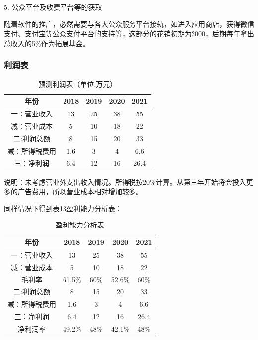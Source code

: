 \documentclass[10pt,letterpaper]{article}
\begin{document}
5. 公众平台及收费平台等的获取

随着软件的推广，必然需要与各大公众服务平台接轨，如进入应用商店，获得微信支付、支付宝等公众支付平台的支持等，这部分的花销初期为2000，后期每年拿出总收入的5\%作为拓展基金。

\subsubsection{利润表}

\begin{table}[!htbp]
\centering
\begin{tabular}{|c|c|c|c|c}
\hline
年份 & 2018 & 2019 & 2020 & 2021 \\
\hline
一：营业收入 & 13 & 25 & 38 &	55 \\
\hline
减：营业成本 & 5 & 10 & 18 & 22 \\
\hline
二:利润总额 & 8 & 15 & 20 & 33 \\
\hline
减：所得税费用	& 1.6 & 3 & 4 & 6.6 \\
\hline
三：净利润 & 6.4 & 12 & 16 & 26.4 \\
\hline
\end{tabular}
\caption{预测利润表（单位:万元）}\label{tab:aStrangeTable}
\end{table}

说明：未考虑营业外支出收入情况。所得税按20\%计算。从第三年开始将会投入更多的广告费用，所以营业成本相对增加较多。

同样情况下得到表13盈利能力分析表：

\begin{table}[!htbp]
\centering
\begin{tabular}{|c|c|c|c|c}
\hline
年份 & 2018 & 2019 & 2020 & 2021 \\
\hline
一：营业收入 & 13 & 25 & 38 &	55 \\
\hline
减：营业成本 & 5 & 10 & 18 & 22 \\
\hline
毛利率 & 61.5\% & 60\% & 52.6\% & 60\% \\
\hline
二:利润总额 & 8 & 15 & 20 & 33 \\
\hline
减：所得税费用	& 1.6 & 3 & 4 & 6.6 \\
\hline
三：净利润 & 6.4 & 12 & 16 & 26.4 \\
\hline
净利润率 & 49.2\% & 48\% & 42.1\% & 48\% \\
\hline
\end{tabular}
\caption{盈利能力分析表}\label{tab:aStrangeTable}
\end{table}
\end{document}
